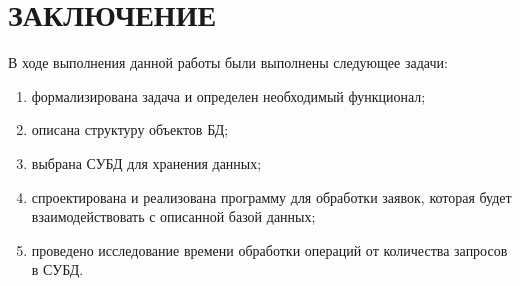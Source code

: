 
\section*{ЗАКЛЮЧЕНИЕ}


В ходе выполнения данной работы были выполнены следующее задачи:

\begin{enumerate}[label=\arabic*)]
	\item формализирована задача и определен необходимый функционал;
	\item описана структуру объектов БД;
	\item выбрана СУБД для хранения данных;
	\item спроектирована и реализована программу для обработки заявок, которая будет взаимодействовать с описанной базой данных; 
	\item проведено исследование времени обработки операций от количества запросов в СУБД.
\end{enumerate}